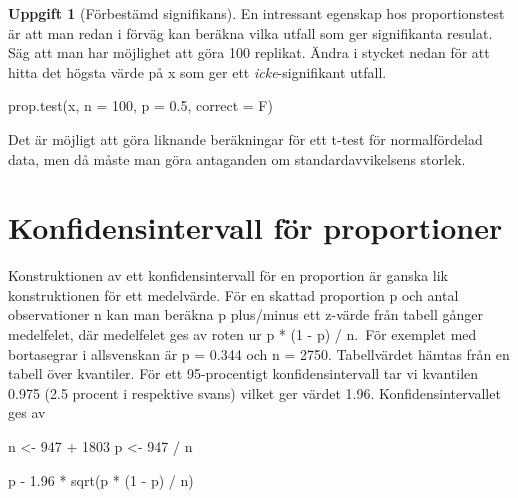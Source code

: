 \documentclass[
]{book}
\newenvironment{Shaded}{\begin{snugshade}}{\end{snugshade}}
\newcommand{\AttributeTok}[1]{\textcolor[rgb]{0.77,0.63,0.00}{#1}}
\newcommand{\DecValTok}[1]{\textcolor[rgb]{0.00,0.00,0.81}{#1}}
\newcommand{\FloatTok}[1]{\textcolor[rgb]{0.00,0.00,0.81}{#1}}
\newcommand{\FunctionTok}[1]{\textcolor[rgb]{0.00,0.00,0.00}{#1}}
\newcommand{\NormalTok}[1]{#1}
\newcommand{\OtherTok}[1]{\textcolor[rgb]{0.56,0.35,0.01}{#1}}
\newcommand{\SpecialCharTok}[1]{\textcolor[rgb]{0.00,0.00,0.00}{#1}}
\theoremstyle{definition}
\theoremstyle{definition}
\theoremstyle{definition}
\newtheorem{exercise}{Uppgift}[chapter]
\theoremstyle{definition}
\theoremstyle{remark}
\begin{document}
\begin{exercise}[Förbestämd signifikans]
En intressant egenskap hos proportionstest är att man redan i förväg kan beräkna vilka utfall som ger signifikanta resulat. Säg att man har möjlighet att göra 100 replikat. Ändra i stycket nedan för att hitta det högsta värde på x som ger ett \emph{icke}-signifikant utfall.

\begin{Shaded}
\begin{Highlighting}[]
\FunctionTok{prop.test}\NormalTok{(x, }\AttributeTok{n =} \DecValTok{100}\NormalTok{, }\AttributeTok{p =} \FloatTok{0.5}\NormalTok{, }\AttributeTok{correct =}\NormalTok{ F)}
\end{Highlighting}
\end{Shaded}

Det är möjligt att göra liknande beräkningar för ett t-test för normalfördelad data, men då måste man göra antaganden om standardavvikelsens storlek.
\end{exercise}

\hypertarget{konfidensintervall-fuxf6r-proportioner}{%
\section{Konfidensintervall för proportioner}\label{konfidensintervall-fuxf6r-proportioner}}

Konstruktionen av ett konfidensintervall för en proportion är ganska lik konstruktionen för ett medelvärde. För en skattad proportion p och antal observationer n kan man beräkna p plus/minus ett z-värde från tabell gånger medelfelet, där medelfelet ges av roten ur p * (1 - p) / n.~För exemplet med bortasegrar i allsvenskan är p = 0.344 och n = 2750. Tabellvärdet hämtas från en tabell över kvantiler. För ett 95-procentigt konfidensintervall tar vi kvantilen 0.975 (2.5 procent i respektive svans) vilket ger värdet 1.96. Konfidensintervallet ges av

\begin{Shaded}
\begin{Highlighting}[]
\NormalTok{n }\OtherTok{\textless{}{-}} \DecValTok{947} \SpecialCharTok{+} \DecValTok{1803}
\NormalTok{p }\OtherTok{\textless{}{-}} \DecValTok{947} \SpecialCharTok{/}\NormalTok{ n}

\NormalTok{p }\SpecialCharTok{{-}} \FloatTok{1.96} \SpecialCharTok{*} \FunctionTok{sqrt}\NormalTok{(p }\SpecialCharTok{*}\NormalTok{ (}\DecValTok{1} \SpecialCharTok{{-}}\NormalTok{ p) }\SpecialCharTok{/}\NormalTok{ n)}
\end{Highlighting}
\end{Shaded}
\end{document}
